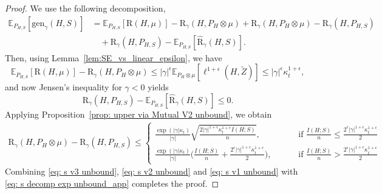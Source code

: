 \documentclass[10pt,a4paper]{amsart}
\newcommand{\RTERM}{\widehat{\mathrm{R}}_{\gamma}}
\newcommand{\RTET}{\mathrm{R}_{\gamma}}
\newcommand{\RTrue}{\mathrm{R}}
\newcommand{\mbE}{\mathbb{E}}
\begin{document}
\begin{proof}
We use the following decomposition, 
     \begin{align}\label{eq: s decomp exp unbound_app}
        \mbE_{P_{H,S}}[\mathrm{gen}_{\gamma}(H,S)]%
            &= \mbE_{P_{H,S}}[ \RTrue(H,\mu)]- \RTET(H,P_{H}\otimes \mu)+ \RTET(H,P_{H}\otimes \mu)-\RTET(H,P_{H,S})\\
            &\quad+ \RTET(H,P_{H,S}) -\mbE_{P_{H,S}}[\RTERM(H,S)]. \nonumber 
    \end{align}
Then, using Lemma~\ref{lem:SE_vs_linear_epsilon}, we have 
\begin{equation}\label{eq: s v1 unbound} %
     \mbE_{P_{H,S}}[ \RTrue(H,\mu)]- \RTET(H,P_{H}\otimes \mu)
     \leq |\gamma|^\epsilon\mbE_{P_H\otimes \mu}[\ell^{1+\epsilon}(H,\tilde Z)]\leq |\gamma|^\epsilon\kappa_t^{1+\epsilon} ,
  \end{equation}
and now Jensen's inequality for $\gamma<0$
 yields
\begin{equation}\label{eq: s v3 unbound}
    \RTET(H,P_{H,S}) -\mbE_{P_{H,S}}[\RTERM(H,S)]\leq 0.
\end{equation}
Applying Proposition~\ref{prop: upper via Mutual V2 unbound}, we obtain 
   \begin{equation}\label{eq: s v2 unbound}
    \begin{split}
          \RTET(H,P_{H}\otimes \mu)-\RTET(H,P_{H,S})\leq  \begin{cases}
            \frac{\exp(|\gamma| \kappa_t)}{|\gamma|} \sqrt{\frac{2|\gamma|^{1+\epsilon} \kappa_t^{1+\epsilon} I(H;S)}{n}},\qquad &\mbox{ if }\frac{I(H;S)}{n}\leq \frac{2^{\epsilon}|\gamma|^{1+\epsilon} \kappa_t^{1+\epsilon}}{2}\\
              \frac{\exp(|\gamma| \kappa_t)}{ |\gamma|}\Big( \frac{ I(H;S)}{n}+\frac{2^{\epsilon}|\gamma|^{1+\epsilon} \kappa_t^{1+\epsilon}}{2}\Big),\qquad & \mbox{ if } \frac{I(H;S)}{n}>\frac{2^{\epsilon}|\gamma|^{1+\epsilon} \kappa_t^{1+\epsilon}}{2}
          \end{cases}
    \end{split} \nonumber 
\end{equation}
  Combining \eqref{eq: s v3 unbound}, \eqref{eq: s v2 unbound} and \eqref{eq: s v1 unbound} with \eqref{eq: s decomp exp unbound_app} completes the proof.
\end{proof}
\end{document}
